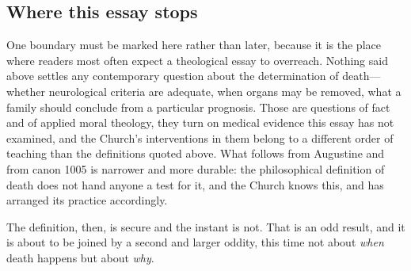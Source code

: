 \subsection{Where this essay stops}

One boundary must be marked here rather than later, because it is the place where readers most often expect a theological essay to overreach. Nothing said above settles any contemporary question about the determination of death---whether neurological criteria are adequate, when organs may be removed, what a family should conclude from a particular prognosis. Those are questions of fact and of applied moral theology, they turn on medical evidence this essay has not examined, and the Church's interventions in them belong to a different order of teaching than the definitions quoted above. What follows from Augustine and from canon 1005 is narrower and more durable: the philosophical definition of death does not hand anyone a test for it, and the Church knows this, and has arranged its practice accordingly.

The definition, then, is secure and the instant is not. That is an odd result, and it is about to be joined by a second and larger oddity, this time not about \emph{when} death happens but about \emph{why}.
